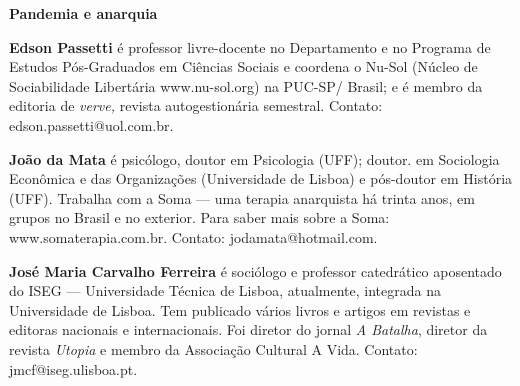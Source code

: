 
\textbf{Pandemia e anarquia} \lipsum[1]


\textbf{Edson Passetti} é professor livre-docente no Departamento e no
Programa de Estudos Pós-Graduados em Ciências Sociais e coordena o
Nu-Sol (Núcleo de Sociabilidade Libertária
www.nu-sol.org) na PUC-SP/ Brasil; e é membro da editoria de \emph{verve,} revista autogestionária semestral. Contato: edson.passetti@uol.com.br.

\textbf{João da Mata} é psicólogo, doutor em Psicologia (UFF); doutor.
em Sociologia Econômica e das Organizações (Universidade de Lisboa) e
pós-doutor em História (UFF). Trabalha com a Soma --- uma terapia
anarquista há trinta anos, em grupos no Brasil e no exterior. Para saber
mais sobre a Soma:
www.somaterapia.com.br. Contato:
jodamata@hotmail.com.

\textbf{José Maria Carvalho Ferreira} é sociólogo e professor
catedrático aposentado do ISEG --- Universidade Técnica de Lisboa,
atualmente, integrada na Universidade de Lisboa. Tem publicado vários
livros e artigos em revistas e editoras nacionais e internacionais. Foi
diretor do jornal \emph{A Batalha}, diretor da revista \emph{Utopia} e
membro da Associação Cultural A Vida. Contato:
jmcf@iseg.ulisboa.pt.



